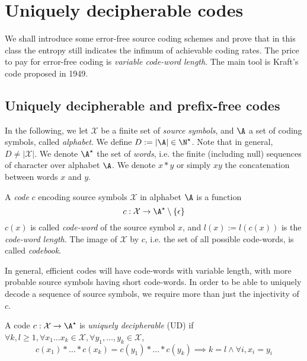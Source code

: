 \documentclass{../cs-classes/cs-classes}
\newcommand*{\X}{\mathcal{X}}
\begin{document}
\section{Uniquely decipherable codes}
We shall introduce some error-free source coding schemes and prove
that in this class the entropy still indicates the infimum of achievable coding rates. The price to pay for error-free coding is \emph{variable code-word length}. The main tool is Kraft's code proposed in 1949.

\subsection{Uniquely decipherable and prefix-free codes}
In the following, we let $\X$ be a finite set of \emph{source symbols}, and $\A$ a set of coding symbols, called \emph{alphabet}. We define $D:=|\A|\in\N^\star$. Note that in general, $D\neq|\X|$. We denote $\A^\star$ the set of \emph{words}, i.e. the finite (including null) sequences of character over alphabet $\A$. We denote $x*y$ or simply $xy$ the concatenation between words $x$ and $y$.

\begin{definition}[Code]
    A \emph{code} $c$ encoding source symbols $\X$ in alphabet $\A$ is a function
    \begin{equation*}
            c: \X\to \A^\star\setminus\{\epsilon\}
    \end{equation*}
    $c(x)$ is called \emph{code-word} of the source symbol $x$, and $l(x):=l(c(x))$ is the \emph{code-word length}. The image of $\X$ by $c$, i.e. the set of all possible code-words, is called \emph{codebook}.
\end{definition}
In general, efficient codes will have code-words with variable length, with more probable source symbols having short code-words. In order to be able to uniquely decode a sequence of source symbols, we require more than just the injectivity of $c$.

\begin{definition}
    A code $c: \X\to\A^\star$ is \emph{uniquely decipherable} (UD) if $\forall k, l \geq 1, \forall x_1\dots x_k\in \X, \forall y_1, \dots, y_k\in \X$,
    \begin{equation*}
        c(x_1)*\dots*c(x_k)=c(y_1)*\dots*c(y_k) \implies k=l \land \forall i, x_i=y_i
    \end{equation*}
\end{definition}
\end{document}
